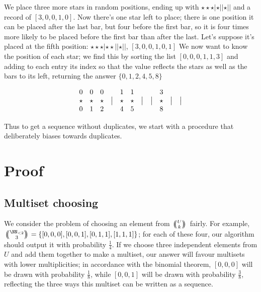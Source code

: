 \documentclass[letterpaper,luatex,11pt]{article}
\newcommand{\multichoose}[2]{
\left.\mathchoice
  {\left(\kern-0.48em\binom{#1}{#2}\kern-0.48em\right)}
  {\big(\kern-0.30em\binom{\smash{#1}}{\smash{#2}}\kern-0.30em\big)}
  {\left(\kern-0.30em\binom{\smash{#1}}{\smash{#2}}\kern-0.30em\right)}
  {\left(\kern-0.30em\binom{\smash{#1}}{\smash{#2}}\kern-0.30em\right)}
\right.}
\begin{document}
We place three more stars in random positions, ending up with
\(\star\star\star|\star||\star||\) and a record of \([3, 0, 0, 1,
0]\). Now there's one star left to place; there is one position it can
be placed after the last bar, but four before the first bar, so it is
four times more likely to be placed before the first bar than after
the last. Let's suppose it's placed at the fifth position:
\(\star\star\star|\star\star||\star||\), \([3, 0, 0, 1, 0, 1]\) We now
want to know the position of each star; we find this by sorting the
list \([0, 0, 0, 1, 1, 3]\) and adding to each entry its index so that
the value reflects the stars as well as the bars to its left,
returning the answer $\{0, 1, 2, 4, 5, 8\}$

\begin{displaymath}
\begin{array}{ c c c c c c c c c c c }
    0 & 0 & 0 & & 1 & 1 & & & 3 & & \\
    \star & \star & \star & \big| & \star & \star & \big| & \big| & \star & \big| & \big| \\
    0 & 1 & 2 & & 4 & 5 & & & 8 & & \\
\end{array}
\end{displaymath}

Thus to get a sequence without duplicates, we start with a procedure
that deliberately biases towards duplicates.

\section{Proof}

\subsection{Multiset choosing}

We consider the problem of choosing an element from
$\multichoose{U}{k}$ fairly. For example, $\multichoose{\NN_{<2}}{3} =
\{[0, 0, 0], [0, 0, 1], [0, 1, 1], [1, 1, 1]\}$; for each of these
four, our algorithm should output it with probability $\frac{1}{4}$.
If we choose three independent elements from $U$ and add them together
to make a multiset, our answer will favour multisets with lower
multiplicities; in accordance with the binomial theorem, $[0, 0, 0]$
will be drawn with probability $\frac{1}{8}$, while $[0, 0, 1]$ will
be drawn with probability $\frac{3}{8}$, reflecting the three ways
this multiset can be written as a sequence.
\end{document}
